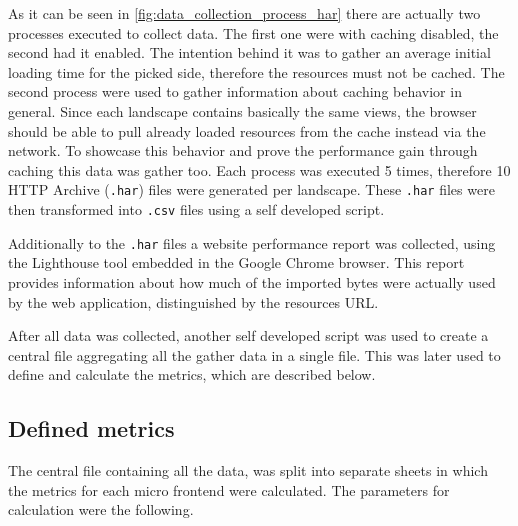 As it can be seen in \ref{fig:data_collection_process_har} there are actually two processes executed to collect data. The first one were with caching disabled, the second had it enabled. The intention behind it was to gather an average initial loading time for the picked side, therefore the resources must not be cached. 
The second process were used to gather information about caching behavior in general. Since each landscape contains basically the same views, the browser should be able to pull already loaded resources from the cache instead via the network. To showcase this behavior and prove the performance gain through caching this data was gather too.
Each process was executed 5 times, therefore 10 HTTP Archive (\texttt{.har}) files were generated per landscape. These \texttt{.har} files were then transformed into \texttt{.csv} files using a self developed script. 

Additionally to the \texttt{.har} files a website performance report was collected, using the Lighthouse tool embedded in the Google Chrome browser. This report provides information about how much of the imported bytes were actually used by the web application, distinguished by the resources URL.

After all data was collected, another self developed script was used to create a central file aggregating all the gather data in a single file. This was later used to define and calculate the metrics, which are described below.

\subsection{Defined metrics}

The central file containing all the data, was split into separate sheets in which the metrics for each micro frontend were calculated. The parameters for calculation were the following.

